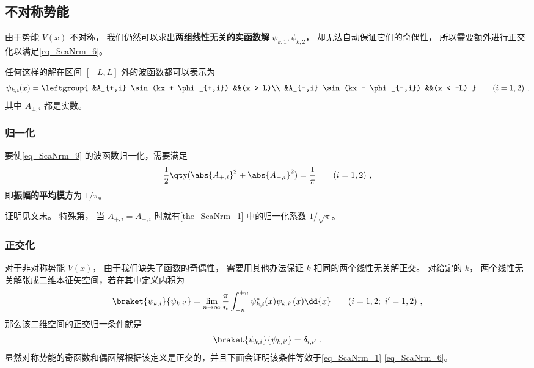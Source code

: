 \subsection{不对称势能}
由于势能 $V(x)$ 不对称， 我们仍然可以求出\textbf{两组线性无关的实函数解} $\psi_{k,1},\psi_{k,2}$， 却无法自动保证它们的奇偶性， 所以需要额外进行正交化以满足\autoref{eq_ScaNrm_6}。

任何这样的解在区间 $[-L,L]$ 外的波函数都可以表示为
\begin{equation}\label{eq_ScaNrm_9}
\psi_{k,i}(x) = \leftgroup{
    &A_{+,i} \sin(kx + \phi_{+,i}) &&(x > L)\\
    &A_{-,i} \sin(kx - \phi_{-,i}) &&(x < -L)
} \qquad (i = 1,2)~.
\end{equation}
其中 $A_{\pm,i}$ 都是实数。

\subsubsection{归一化}
\begin{theorem}{}\label{the_ScaNrm_2}
要使\autoref{eq_ScaNrm_9} 的波函数归一化，需要满足
\begin{equation}\label{eq_ScaNrm_4}
\frac{1}{2}\qty(\abs{A_{+,i}}^2 + \abs{A_{-,i}}^2) = \frac{1}{\pi} \qquad (i = 1,2)~,
\end{equation}
即\textbf{振幅的平均模方}为 $1/\pi$。
\end{theorem}
证明见文末。 特殊第， 当 $A_{+,i} = A_{-,i}$ 时就有\autoref{the_ScaNrm_1} 中的归一化系数 $1/\sqrt{\pi}$。

\subsubsection{正交化}
对于非对称势能 $V(x)$， 由于我们缺失了函数的奇偶性， 需要用其他办法保证 $k$ 相同的两个线性无关解正交。 对给定的 $k$， 两个线性无关解张成二维本征矢空间，若在其中定义内积为
\begin{equation}\label{eq_ScaNrm_13}
\braket{\psi_{k,i}}{\psi_{k,i'}} = \lim_{n\to\infty}\frac{\pi}{n}\int_{-n}^{+n} \psi_{k,i}^*(x) \psi_{k,i'}(x) \dd{x} \qquad (i = 1,2;\ i' = 1,2)~,
\end{equation}
那么该二维空间的正交归一条件就是
\begin{equation}\label{eq_ScaNrm_7}
\braket{\psi_{k,i}}{\psi_{k,i'}} = \delta_{i,i'}~.
\end{equation}
显然对称势能的奇函数和偶函解根据该定义是正交的，并且下面会证明该条件等效于\autoref{eq_ScaNrm_1} \autoref{eq_ScaNrm_6}。


